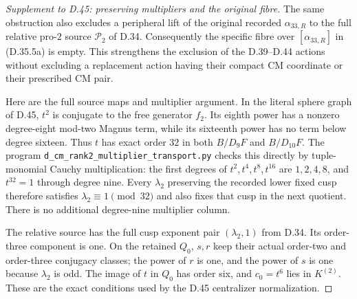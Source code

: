 \begin{proof}[Supplement to D.45: preserving multipliers and the original fibre]
The same obstruction also excludes a peripheral lift of the original
recorded \(\alpha_{33,R}\) to the full relative pro-\(2\) source
\(\mathcal P_2\) of D.34. Consequently the specific fibre
over \([\alpha_{33,R}]\) in (D.35.5a) is empty. This strengthens
the exclusion of the D.39--D.44 actions without excluding a
replacement action having their compact CM coordinate or
their prescribed CM pair.

Here are the full source maps and multiplier argument.
In the literal sphere graph of D.45, \(t^2\) is conjugate to
the free generator \(f_2\). Its eighth power has a nonzero
degree-eight mod-two Magnus term, while its sixteenth power
has no term below degree sixteen. Thus \(t\) has exact
order \(32\) in both \(B/D_9F\) and \(B/D_{10}F\).
The program \texttt{d\_cm\_rank2\_multiplier\_transport.py}
checks this directly by tuple-monomial Cauchy multiplication:
the first degrees of \(t^2,t^4,t^8,t^{16}\) are
\(1,2,4,8\), and \(t^{32}=1\) through degree nine.
Every \(\lambda_2\) preserving the recorded lower fixed
cusp therefore satisfies \(\lambda_2\equiv1\pmod{32}\)
and also fixes that cusp in the next quotient. There is
no additional degree-nine multiplier column.

The relative source has the full cusp exponent pair
\((\lambda_2,1)\) from D.34. Its order-three component
is one. On the retained \(Q_0\), \(s,r\) keep their
actual order-two and order-three conjugacy classes;
the power of \(r\) is one, and the power of \(s\)
is one because \(\lambda_2\) is odd. The image of
\(t\) in \(Q_0\) has order six, and
\(c_0=t^6\) lies in \(K^{(2)}\).
These are the exact conditions used by the
D.45 centralizer normalization.



\end{proof}
